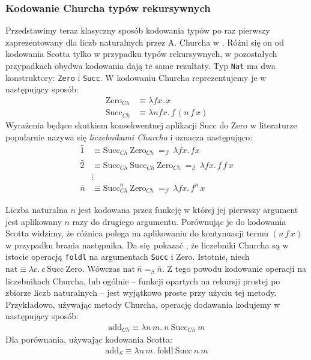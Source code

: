 \subsubsection{Kodowanie Churcha typów rekursywnych}
Przedstawimy teraz klasyczny sposób kodowania typów po raz pierwszy zaprezentowany dla liczb naturalnych przez A. Churcha w \cite{Church1941-CHUTCO-7}. Różni się on od kodowania Scotta tylko w przypadku typów rekursywnych, w pozostałych przypadkach obydwa kodowania dają te same rezultaty. Typ \texttt{Nat} ma dwa konstruktory: \texttt{Zero} i \texttt{Succ}. W kodowaniu Churcha reprezentujemy je w następujący sposób:
\begin{align*}
  \mathrm{Zero}_{Ch} &\equiv \lambda f x.\,x\\
  \mathrm{Succ}_{Ch} &\equiv \lambda n f x.\,f\,(n\,f\,x)
\end{align*}
Wyrażenia będące skutkiem konsekwentnej aplikacji Succ do Zero w literaturze popularnie nazywa się \emph{liczebnikami Churcha} i oznacza następująco:
\begin{align*}
  \bar{1} &\equiv \mathrm{Succ}_{Ch}\ \mathrm{Zero}_{Ch} \ =_\beta\ \lambda f x.\, fx\\
  \bar{2} &\equiv \mathrm{Succ}_{Ch}\ \mathrm{Succ}_{Ch}\ \mathrm{Zero}_{Ch}\ =_\beta\ \lambda f x.\, f\,f\,x\\
    &\vdots \\
  \bar{n} &\equiv \mathrm{Succ}_{Ch}^n\ \mathrm{Zero}_{Ch}\  =_\beta\  \lambda f x.\, f^n\,x
\end{align*}

Liczba naturalna \(n\) jest kodowana przez funkcję w której jej pierwszy argument jest aplikowany \(n\) razy do drugiego argumentu.
Porównując je do kodowania Scotta widzimy, że różnica polega na aplikowaniu do kontynuacji termu \((n\,f\,x)\) w przypadku brania następnika. Da się pokazać \cite{hinze_2005}, że liczebniki Churcha są w istocie operacją \texttt{foldl} na argumentach \texttt{Succ} i {Zero}. Istotnie, niech \(\mathrm{nat} \equiv \lambda c.\ c\ \mathrm{Succ}\ \mathrm{Zero}\). Wówczas \(\mathrm{nat}\ \bar{n} =_\beta \bar{n}\). Z tego powodu kodowanie operacji na liczebnikach Churcha, lub ogólnie – funkcji opartych na rekursji prostej po zbiorze liczb naturalnych – jest wyjątkowo proste przy użyciu tej metody. Przykładowo, używając metody Churcha, operację dodawania kodujemy w następujący sposób:
\begin{align*}
  \mathrm{add}_{Ch} \equiv \lambda n\, m.\ n\ \mathrm{Succ}_{Ch}\ m
\end{align*}
Dla porównania, używając kodowania Scotta:
\begin{align*}
  \mathrm{add}_{S} \equiv \lambda n\,m.\ \mathrm{foldl}\ \mathrm{Succ}\ n\ m
\end{align*}
